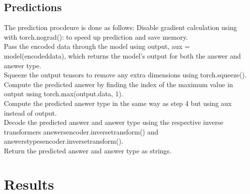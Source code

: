 \documentclass{report}
\begin{document}
\subsection{Predictions}
The prediction procdeure is done as follows:
Disable gradient calculation using with torch.nograd(): to speed up prediction and save memory.\\
Pass the encoded data through the model using output, aux = model(encodeddata), which returns the model's output for both the answer and answer type.\\
Squeeze the output tensors to remove any extra dimensions using torch.squeeze().\\
Compute the predicted answer by finding the index of the maximum value in output using torch.max(output.data, 1).\\
Compute the predicted answer type in the same way as step 4 but using aux instead of output.\\
Decode the predicted answer and answer type using the respective inverse transformers answersencoder.inversetransform() and answerstypesencoder.inversetransform().\\
Return the predicted answer and answer type as strings.\\

\section{Results}
\end{document}
